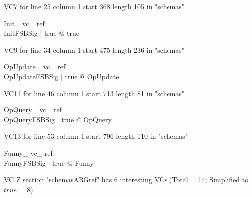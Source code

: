 \documentclass{article}
\begin{document}
VC7 for line 25 column 1 start 368 length 105 in "schemas"
\begin{theorem}{ Init\_ vc\_ ref}\\
 \exists InitFSBSig | true @ true \\

\end{theorem}

VC9 for line 34 column 1 start 475 length 236 in "schemas"
\begin{theorem}{ OpUpdate\_ vc\_ ref}\\
 \forall OpUpdateFSBSig | true @ \pre OpUpdate \\

\end{theorem}

VC11 for line 46 column 1 start 713 length 81 in "schemas"
\begin{theorem}{ OpQuery\_ vc\_ ref}\\
 \forall OpQueryFSBSig | true @ \pre OpQuery \\

\end{theorem}

VC13 for line 53 column 1 start 796 length 110 in "schemas"
\begin{theorem}{ Funny\_ vc\_ ref}\\
 \forall FunnyFSBSig | true @ \pre Funny \\

\end{theorem}



 VC Z section "schemasARGref" has $6$ interesting VCs (Total = 14; Simplified to $true$ = 8).



\end{document}
